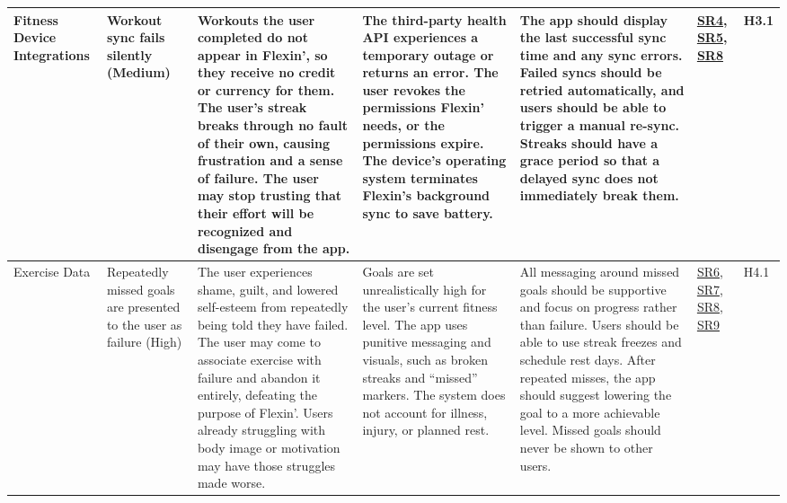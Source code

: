\documentclass{article}
\begin{document}
\begin{landscape}
{\begin{longtable}{|p{2.5cm}|p{3cm}|p{3.8cm}|p{3.8cm}|p{5.5cm}|p{1.8cm}|p{1cm}|}
            \hline
            Fitness Device Integrations & Workout sync fails silently (Medium) & \textbullet{} Workouts the user completed do not appear in Flexin', so they receive no credit or currency for them. \newline \textbullet{} The user's streak breaks through no fault of their own, causing frustration and a sense of failure. \newline \textbullet{} The user may stop trusting that their effort will be recognized and disengage from the app. & \textbullet{} The third-party health API experiences a temporary outage or returns an error. \newline \textbullet{} The user revokes the permissions Flexin' needs, or the permissions expire. \newline \textbullet{} The device's operating system terminates Flexin's background sync to save battery. & \textbullet{} The app should display the last successful sync time and any sync errors. \newline \textbullet{} Failed syncs should be retried automatically, and users should be able to trigger a manual re-sync. \newline \textbullet{} Streaks should have a grace period so that a delayed sync does not immediately break them. & \hyperlink{sr4}{SR4}, \hyperlink{sr5}{SR5}, \hyperlink{sr8}{SR8} & H3.1 \\
            \hline
            Exercise Data & Repeatedly missed goals are presented to the user as failure (High) & \textbullet{} The user experiences shame, guilt, and lowered self-esteem from repeatedly being told they have failed. \newline \textbullet{} The user may come to associate exercise with failure and abandon it entirely, defeating the purpose of Flexin'. \newline \textbullet{} Users already struggling with body image or motivation may have those struggles made worse. & \textbullet{} Goals are set unrealistically high for the user's current fitness level. \newline \textbullet{} The app uses punitive messaging and visuals, such as broken streaks and ``missed'' markers. \newline \textbullet{} The system does not account for illness, injury, or planned rest. & \textbullet{} All messaging around missed goals should be supportive and focus on progress rather than failure. \newline \textbullet{} Users should be able to use streak freezes and schedule rest days. \newline \textbullet{} After repeated misses, the app should suggest lowering the goal to a more achievable level. \newline \textbullet{} Missed goals should never be shown to other users. & \hyperlink{sr6}{SR6}, \hyperlink{sr7}{SR7}, \hyperlink{sr8}{SR8}, \hyperlink{sr9}{SR9} & H4.1 \\

\end{longtable}}
\end{landscape}
\end{document}

